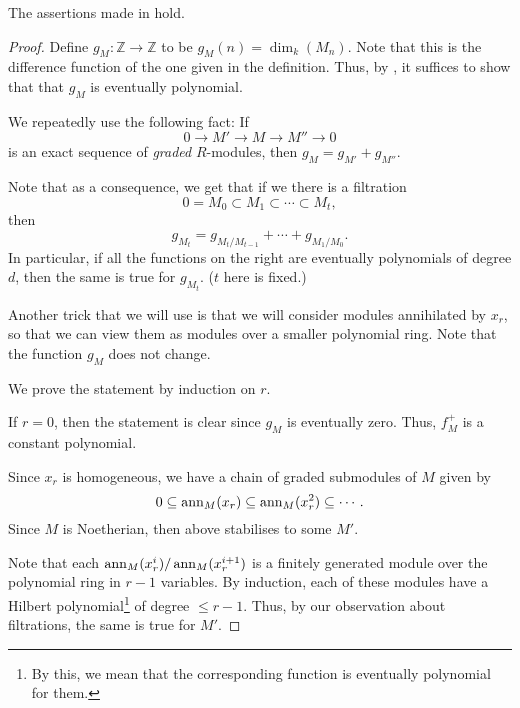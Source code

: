 \documentclass[12pt]{article}
\begin{document}
\begin{prop} \label{prop:hilbert-function}
	The assertions made in  hold.
\end{prop}
\begin{proof} 
	Define $g_{M} : \mathbb{Z} \to \mathbb{Z}$ to be $g_{M}(n) = \dim_{k}(M_{n})$. Note that this is the difference function of the one given in the definition. Thus, by , it suffices to show that that $g_{M}$ is eventually polynomial.

	We repeatedly use the following fact: If 
	\begin{equation*} 
		0 \to M' \to M \to M'' \to 0
	\end{equation*}
	is an exact sequence of \emph{graded} $R$-modules, then $g_{M} = g_{M'} + g_{M''}$.

	Note that as a consequence, we get that if we there is a filtration
	\begin{equation*} 
		0 = M_{0} \subset M_{1} \subset \cdots \subset M_{t},
	\end{equation*}
	then
	\begin{equation*} 
		g_{M_{t}} = g_{M_{t}/M_{t - 1}} + \cdots + g_{M_{1}/M_{0}}.
	\end{equation*}
	In particular, if all the functions on the right are eventually polynomials of degree $d$, then the same is true for $g_{M_{t}}$. ($t$ here is fixed.)

	Another trick that we will use is that we will consider modules annihilated by $x_{r}$, so that we can view them as modules over a smaller polynomial ring. Note that the function $g_{M}$ does not change.

	We prove the statement by induction on $r$.

	If $r = 0$, then the statement is clear since $g_{M}$ is eventually zero. Thus, $f_{M}^{+}$ is a constant polynomial.

	Since $x_{r}$ is homogeneous, we have a chain of graded submodules of $M$ given by
	\begin{equation*} 
		0 \subseteq \operatorname{ann}_{M}(x_{r}) \subseteq \operatorname{ann}_{M}(x_{r}^{2}) \subseteq \cdots.
	\end{equation*}
	Since $M$ is Noetherian, then above stabilises to some $M'$. 

	Note that each $\operatorname{ann}_{M}(x_{r}^{i})/\operatorname{ann}_{M}(x_{r}^{i + 1})$ is a finitely generated module over the polynomial ring in $r - 1$ variables. By induction, each of these modules have a Hilbert polynomial\footnote{By this, we mean that the corresponding function is eventually polynomial for them.} of degree $\le r - 1$. Thus, by our observation about filtrations, the same is true for $M'$. 


\end{proof}
\end{document}
